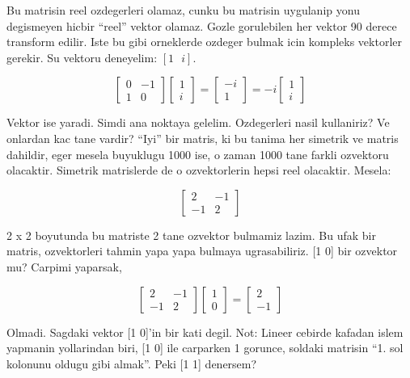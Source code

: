 \documentclass[12pt,fleqn]{article}
\begin{document}
Bu matrisin reel ozdegerleri olamaz, cunku bu matrisin uygulanip yonu
degismeyen hicbir ``reel'' vektor olamaz. Gozle gorulebilen her vektor 90
derece transform edilir. Iste bu gibi orneklerde ozdeger bulmak icin
kompleks vektorler gerekir. Su vektoru deneyelim: $[1 \ \ \ i]$. 

\[ 
\left[\begin{array}{rr}
0 & -1 \\
1 & 0
\end{array}\right]
\left[\begin{array}{c}
1 \\
i
\end{array}\right]
= 
\left[\begin{array}{c}
-i \\
1
\end{array}\right]
= 
-i
\left[\begin{array}{c}
1 \\
i
\end{array}\right]
 \]

Vektor ise yaradi. Simdi ana noktaya gelelim. Ozdegerleri nasil
kullaniriz? Ve onlardan kac tane vardir? ``Iyi'' bir matris, ki bu tanima
her simetrik ve matris dahildir, eger mesela buyuklugu 1000 ise, o zaman
1000 tane farkli ozvektoru olacaktir. Simetrik matrislerde de o
ozvektorlerin hepsi reel olacaktir. Mesela:

\[ 
\left[\begin{array}{rr}
2 & -1 \\
-1 & 2
\end{array}\right]
 \]

2 x 2 boyutunda bu matriste 2 tane ozvektor bulmamiz lazim. Bu ufak bir
matris, ozvektorleri tahmin yapa yapa bulmaya ugrasabiliriz. [1 0] bir
ozvektor mu?  Carpimi yaparsak,

\[ 
\left[\begin{array}{rr}
2 & -1 \\
-1 & 2
\end{array}\right]
\left[\begin{array}{c}
1 \\
0
\end{array}\right]
=
\left[\begin{array}{r}
2 \\
-1
\end{array}\right]
 \]

Olmadi. Sagdaki vektor [1 0]'in bir kati degil. Not: Lineer cebirde kafadan
islem yapmanin yollarindan biri, [1 0] ile carparken 1 gorunce, soldaki
matrisin ``1. sol kolonunu oldugu gibi almak''. Peki [1 1]
denersem? 
\end{document}
